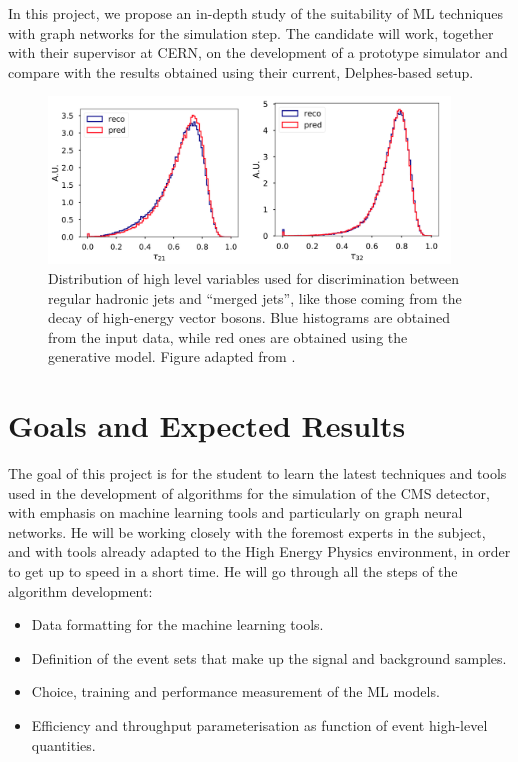 \documentclass[12pt,a4paper]{sprace}
\begin{document}
In this project, we propose an in-depth study of the suitability of ML techniques with graph networks for the simulation step. The candidate will work, together with their supervisor at CERN, on the development of a prototype simulator and compare with the results obtained using their current, Delphes-based setup.
 
\begin{figure}[t] %
   \centering
   \includegraphics[width=0.95\textwidth]{GenerativeSubjettiness.png} 
   \caption{Distribution of high level variables used for discrimination between regular hadronic jets and ``merged jets'', like those coming from the decay of high-energy vector bosons. Blue histograms are obtained from the input data, while red ones are obtained using the generative model. Figure adapted from \cite{Musella:2018rdi}.}
   \label{fig:generativetau}
   \end{figure}

\clearpage

\section{Goals and Expected Results}

The goal of this project is for the student to learn the latest techniques and tools used in the development of algorithms for the simulation of the CMS detector, with emphasis on machine learning tools and particularly on graph neural networks. He will be working closely with the foremost experts in the subject, and with tools already adapted to the High Energy Physics environment, in order to get up to speed in a short time. He will go through all the steps of the algorithm development:
\begin{itemize}
\item Data formatting for the machine learning tools.
\item Definition of the event sets that make up the signal and background samples.
\item Choice, training and performance measurement of the ML models.
\item Efficiency and throughput parameterisation as function of event high-level quantities.
\end{itemize}
\end{document}
